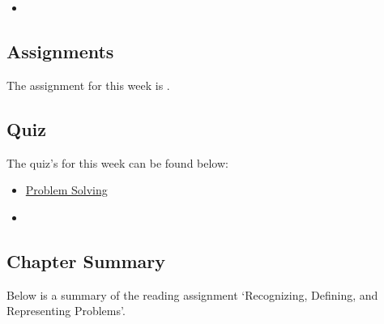 \begin{itemize}
    \item {}
\end{itemize}

\subsection{Assignments}

The assignment for this week is .  

\subsection{Quiz}

The quiz's for this week can be found below:

\begin{itemize}
    \item \href{https://applied.cs.colorado.edu/mod/quiz/view.php?id=49353}{Problem Solving}  
    \item {}
\end{itemize}

\subsection{Chapter Summary}

Below is a summary of the reading assignment `Recognizing, Defining, and Representing Problems'.

